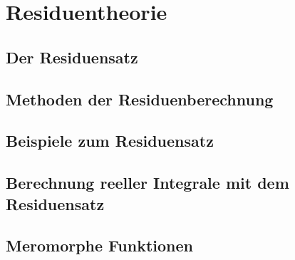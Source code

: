 \section{Residuentheorie}

\subsection{Der Residuensatz}

\subsection{Methoden der Residuenberechnung}

\subsection{Beispiele zum Residuensatz}

\subsection{Berechnung reeller Integrale mit dem Residuensatz}

\subsection{Meromorphe Funktionen}

